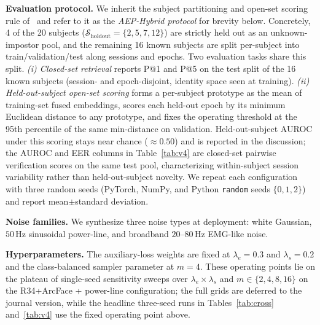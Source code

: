 \documentclass[conference,a4paper]{APSIPA2026}
\begin{document}
\textbf{Evaluation protocol.} We inherit the subject partitioning and
open-set scoring rule of~\cite{vu2026aisei} and refer to it as the
\emph{AEP-Hybrid protocol} for brevity below. Concretely, 4 of the
20 subjects ($\mathcal{S}_{\mathrm{holdout}}=\{2,5,7,12\}$) are
strictly held out as an unknown-impostor pool, and the remaining 16
known subjects are split per-subject into train/validation/test along
sessions and epochs. Two evaluation tasks share this split.
\emph{(i) Closed-set retrieval} reports P@1 and P@5 on the test split
of the 16 known subjects (session- and epoch-disjoint, identity space
seen at training).
\emph{(ii) Held-out-subject open-set scoring} forms a per-subject
prototype as the mean of training-set fused embeddings, scores each
held-out epoch by its minimum Euclidean distance to any prototype, and
fixes the operating threshold at the 95th percentile of the same
min-distance on validation. Held-out-subject AUROC under this scoring
stays near chance ($\approx 0.50$) and is reported in the discussion;
the AUROC and EER columns in Table~\ref{tab:v4} are closed-set
pairwise verification scores on the same test pool, characterizing
within-subject session variability rather than held-out-subject
novelty. We repeat each configuration with three random seeds
(PyTorch, NumPy, and Python \texttt{random} seeds $\{0,1,2\}$) and
report mean$\pm$standard deviation.

\textbf{Noise families.} We synthesize three noise types at deployment:
white Gaussian, $50$\,Hz sinusoidal power-line, and broadband
$20$--$80$\,Hz EMG-like noise.

\textbf{Hyperparameters.} The auxiliary-loss weights are fixed at
$\lambda_{e}=0.3$ and $\lambda_{s}=0.2$ and the class-balanced sampler
parameter at $m=4$. These operating points lie on the plateau of
single-seed sensitivity sweeps over $\lambda_{e}\!\times\!\lambda_{s}$
and $m\in\{2,4,8,16\}$ on the R34+ArcFace + power-line configuration;
the full grids are deferred to the journal version, while the headline
three-seed runs in Tables~\ref{tab:cross} and~\ref{tab:v4} use the
fixed operating point above.
\end{document}
